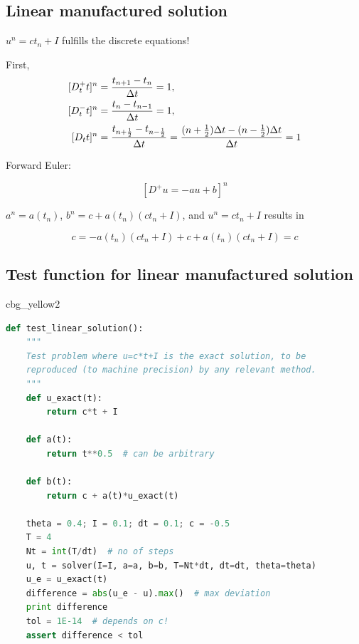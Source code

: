 \documentclass[%
oneside,                 %
final,                   %
10pt]{article}
\newenvironment{_cod_tight}[1]{
   \def\FrameCommand{\colorbox{#1}}
   \FrameRule0.6pt\MakeFramed {\FrameRestore}\vskip3mm}
   {\vskip0mm\endMakeFramed}
\newenvironment{cod}[1]{
\bgroup\rmfamily
\fboxsep=0mm\relax
\begin{_cod_tight}{#1}
\list{}{\parsep=-2mm\parskip=0mm\topsep=0pt\leftmargin=2mm
\rightmargin=2\leftmargin\leftmargin=4pt\relax}
\item\relax}
{\endlist\end{_cod_tight}\egroup}
\begin{document}
\noindent
\subsection*{Linear manufactured solution}

$u^n = ct_n+I$ fulfills the discrete
equations!

First,
\begin{align}
\lbrack D_t^+ t\rbrack^n &= \frac{t_{n+1}-t_n}{\Delta t}=1,
\label{decay:fd2:Dop:tn:fw}\\ 
\lbrack D_t^- t\rbrack^n &= \frac{t_{n}-t_{n-1}}{\Delta t}=1,
\label{decay:fd2:Dop:tn:bw}\\ 
\lbrack D_t t\rbrack^n &= \frac{t_{n+\half}-t_{n-\half}}{\Delta t}=\frac{(n+\half)\Delta t - (n-\half)\Delta t}{\Delta t}=1\label{decay:fd2:Dop:tn:cn}
\end{align}

Forward Euler:

\[ [D^+ u = -au + b]^n \]

$a^n=a(t_n)$, $b^n=c + a(t_n)(ct_n + I)$, and $u^n=ct_n + I$
results in

\[ c = -a(t_n)(ct_n+I) + c + a(t_n)(ct_n + I) = c \]

\subsection*{Test function for linear manufactured solution}

\begin{cod}{cbg_yellow2}\begin{lstlisting}[language=Python,style=simple,xleftmargin=2mm]
def test_linear_solution():
    """
    Test problem where u=c*t+I is the exact solution, to be
    reproduced (to machine precision) by any relevant method.
    """
    def u_exact(t):
        return c*t + I

    def a(t):
        return t**0.5  # can be arbitrary

    def b(t):
        return c + a(t)*u_exact(t)

    theta = 0.4; I = 0.1; dt = 0.1; c = -0.5
    T = 4
    Nt = int(T/dt)  # no of steps
    u, t = solver(I=I, a=a, b=b, T=Nt*dt, dt=dt, theta=theta)
    u_e = u_exact(t)
    difference = abs(u_e - u).max()  # max deviation
    print difference
    tol = 1E-14  # depends on c!
    assert difference < tol
\end{lstlisting}\end{cod}
\noindent

\end{document}
